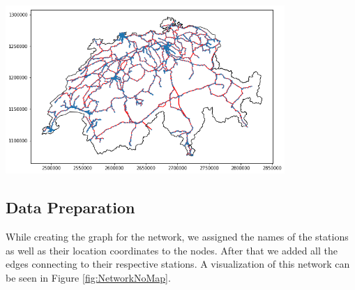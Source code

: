 \documentclass{Resources/netsci-project}
\begin{document}
\begin{center}
    \centering
    \includegraphics[width=300pt]{Resources/Network_on_map}
    \label{fig:NetworkOnMap}
\end{center}

\subsection{Data Preparation}
While creating the graph for the network, we assigned the names of the stations as well as their location coordinates to the nodes. After that we added all the edges connecting to their respective stations. A visualization of this network can be seen in Figure \ref{fig:NetworkNoMap}.
\end{document}
